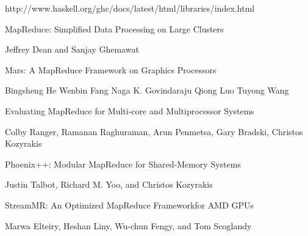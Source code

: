 \documentclass[11pt,a4paper,twocolumn] {scrartcl}   %
\begin{document}
\begin{thebibliography}{9}
    http://www.haskell.org/ghc/docs/latest/html/libraries/index.html

    MapReduce: Simplified Data Processing on Large Clusters

    Jeffrey Dean and Sanjay Ghemawat

  Mars: A MapReduce Framework on Graphics Processors

  Bingsheng He Wenbin Fang Naga K. Govindaraju Qiong Luo Tuyong Wang

  Evaluating MapReduce for Multi-core and Multiprocessor Systems

  Colby Ranger, Ramanan Raghuraman, Arun Penmetsa, Gary Bradski, Christos Kozyrakis

    Phoenix++: Modular MapReduce for Shared-Memory Systems

    Justin Talbot, Richard M. Yoo, and Christos Kozyrakis

    StreamMR: An Optimized MapReduce Frameworkfor AMD GPUs

    Marwa Elteiry, Heshan Liny, Wu-chun Fengy, and Tom Scoglandy

\thispagestyle{empty}
\pagestyle{empty}
\end{thebibliography}
\end{document}
